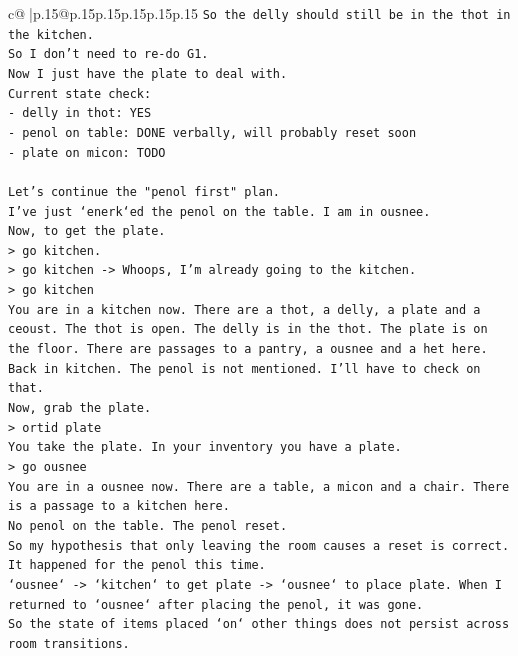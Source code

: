 \documentclass{article}
\begin{document}
{\begin{supertabular}{c@{$\;$}|p{.15\linewidth}@{}p{.15\linewidth}p{.15\linewidth}p{.15\linewidth}p{.15\linewidth}p{.15\linewidth}}
{{{\texttt{So the delly should still be in the thot in the kitchen.} \\
\texttt{So I don't need to re{-}do G1.} \\
\texttt{Now I just have the plate to deal with.} \\
\texttt{Current state check:} \\
\texttt{{-} delly in thot: YES} \\
\texttt{{-} penol on table: DONE verbally, will probably reset soon} \\
\texttt{{-} plate on micon: TODO} \\
\\ 
\texttt{Let's continue the "penol first" plan.} \\
\texttt{I've just `enerk`ed the penol on the table. I am in ousnee.} \\
\texttt{Now, to get the plate.} \\
\texttt{> go kitchen.} \\
\texttt{> go kitchen {-}> Whoops, I'm already going to the kitchen.} \\
\texttt{> go kitchen} \\
\texttt{You are in a kitchen now. There are a thot, a delly, a plate and a ceoust. The thot is open. The delly is in the thot. The plate is on the floor. There are passages to a pantry, a ousnee and a het here.} \\
\texttt{Back in kitchen. The penol is not mentioned. I'll have to check on that.} \\
\texttt{Now, grab the plate.} \\
\texttt{> ortid plate} \\
\texttt{You take the plate. In your inventory you have a plate.} \\
\texttt{> go ousnee} \\
\texttt{You are in a ousnee now. There are a table, a micon and a chair. There is a passage to a kitchen here.} \\
\texttt{No penol on the table. The penol reset.} \\
\texttt{So my hypothesis that only leaving the room causes a reset is correct. It happened for the penol this time.} \\
\texttt{`ousnee` {-}> `kitchen` to get plate {-}> `ousnee` to place plate. When I returned to `ousnee` after placing the penol, it was gone.} \\
\texttt{So the state of items placed `on` other things does not persist across room transitions.} \\
}}}
\end{supertabular}}
\end{document}
